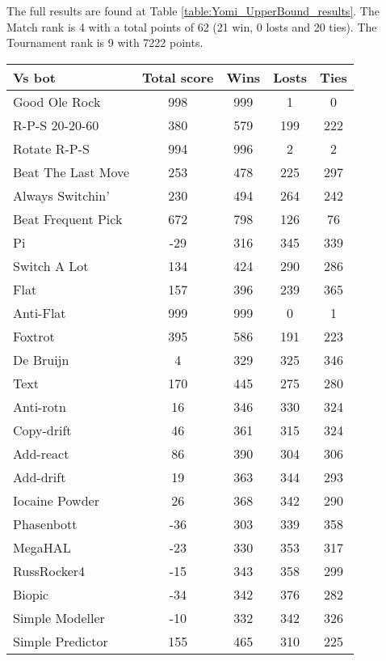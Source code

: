 The full results are found at Table \ref{table:Yomi_UpperBound_results}. The Match rank is 4 with a total points of 62 (21 win, 0 losts and 20 ties). The Tournament rank is 9 with 7222 points.

\begin{table*}
    \caption{Yomi_UpperBound results}
    \label{table:Yomi_UpperBound_results}
    \centering
    \begin{tabular}{|l|c|c|c|c|}
        \hline
        \textbf{Vs bot} & \textbf{Total score} & \textbf{Wins} & \textbf{Losts} & \textbf{Ties} \\ \hline
Good Ole Rock & 998 & 999 & 1 & 0 \\ \hline 
R-P-S 20-20-60 & 380 & 579 & 199 & 222 \\ \hline 
Rotate R-P-S & 994 & 996 & 2 & 2 \\ \hline 
Beat The Last Move & 253 & 478 & 225 & 297 \\ \hline 
Always Switchin' & 230 & 494 & 264 & 242 \\ \hline 
Beat Frequent Pick & 672 & 798 & 126 & 76 \\ \hline 
Pi & -29 & 316 & 345 & 339 \\ \hline 
Switch A Lot & 134 & 424 & 290 & 286 \\ \hline 
Flat & 157 & 396 & 239 & 365 \\ \hline 
Anti-Flat & 999 & 999 & 0 & 1 \\ \hline 
Foxtrot & 395 & 586 & 191 & 223 \\ \hline 
De Bruijn & 4 & 329 & 325 & 346 \\ \hline 
Text & 170 & 445 & 275 & 280 \\ \hline 
Anti-rotn & 16 & 346 & 330 & 324 \\ \hline 
Copy-drift & 46 & 361 & 315 & 324 \\ \hline 
Add-react & 86 & 390 & 304 & 306 \\ \hline 
Add-drift & 19 & 363 & 344 & 293 \\ \hline 
Iocaine Powder & 26 & 368 & 342 & 290 \\ \hline 
Phasenbott & -36 & 303 & 339 & 358 \\ \hline 
MegaHAL & -23 & 330 & 353 & 317 \\ \hline 
RussRocker4 & -15 & 343 & 358 & 299 \\ \hline 
Biopic & -34 & 342 & 376 & 282 \\ \hline 
Simple Modeller & -10 & 332 & 342 & 326 \\ \hline 
Simple Predictor & 155 & 465 & 310 & 225 \\ \hline 

\end{tabular}
\end{table*}
